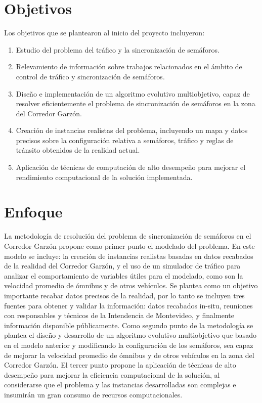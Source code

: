 \section{Objetivos}

Los objetivos que se plantearon al inicio del proyecto incluyeron:

\begin{enumerate}
	\item Estudio del problema del tráfico y la sincronización de semáforos.
	\item Relevamiento de información sobre trabajos relacionados en el ámbito de control de tráfico y sincronización de semáforos.
	\item Diseño e implementación de un algoritmo evolutivo multiobjetivo, capaz de resolver eficientemente el problema de sincronización de semáforos en la zona del Corredor Garzón.
	\item Creación de instancias realistas del problema, incluyendo un mapa y datos precisos sobre la configuración relativa a semáforos, tráfico y reglas de tránsito obtenidos de la realidad actual.	
	\item Aplicación de técnicas de computación de alto desempeño para mejorar el rendimiento computacional de la solución implementada.

\end{enumerate}

 
\section{Enfoque}

La metodología de resolución del problema de sincronización de semáforos en el Corredor Garzón propone como primer punto el modelado del problema. En este modelo se incluye: la creación de instancias realistas basadas en datos recabados de la realidad del Corredor Garzón, y el uso de un simulador de tráfico para analizar el comportamiento de variables útiles para el modelado, como son la velocidad promedio de ómnibus y de otros vehículos. Se plantea como un objetivo importante recabar datos precisos de la realidad, por lo tanto se incluyen tres fuentes para obtener y validar la información: datos recabados in-situ, reuniones con responsables y técnicos de la Intendencia de Montevideo, y finalmente información disponible públicamente.
Como segundo punto de la metodología se plantea el diseño y desarrollo de un algoritmo evolutivo multiobjetivo que basado en el modelo anterior y modificando la configuración de los semáforos, sea capaz de mejorar la velocidad promedio de ómnibus y de otros vehículos en la zona del Corredor Garzón. El tercer punto propone la aplicación de técnicas de alto desempeño para mejorar la eficiencia computacional de la solución, al considerarse que el problema y las instancias desarrolladas son complejas e insumirán un gran consumo de recursos computacionales. 




